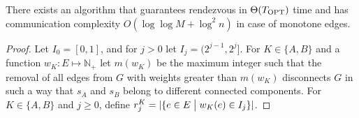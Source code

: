 \documentclass{llncs}
\newcommand{\Topts}{T_{\scriptsize \textup{OPT}}}
\newcommand{\startpos}[1]{s_{#1}}
\newcommand{\starta}{\startpos{A}}
\newcommand{\startb}{\startpos{B}}
\newcommand{\nat}{\mathbb{N}_{+}}
\newcommand{\agentVariable}{K}
\newcommand{\st}{\hspace{0.1cm}\bigl|\bigr.\hspace{0.1cm}}
\begin{document}
\begin{theorem} \label{thm:monotone_edges+no-visibility}
There exists an algorithm that guarantees rendezvous in  $\Theta(\Topts)$ time and 
has communication complexity $O(\log\log M+\log^2n)$ in case of monotone edges.
\end{theorem}
\begin{proof}
Let $I_0=[0,1]$, and for $j>0$ let $I_j=(2^{j-1},2^j]$.
For ${\agentVariable}\in\{A,B\}$ and a function $w_{\agentVariable}\colon E \mapsto \nat$ let $m(w_{\agentVariable})$ be the maximum integer such that the removal of all edges from $G$ with weights greater than $m(w_{\agentVariable})$ disconnects $G$ in such a way that $\starta$ and $\startb$ belong to different connected components.
For ${\agentVariable}\in\{A,B\}$ and $j\geq 0$, define $r^{\agentVariable}_j=|\{e\in E\st w_{\agentVariable}(e)\in I_j\}|$.


\end{proof}
\end{document}
